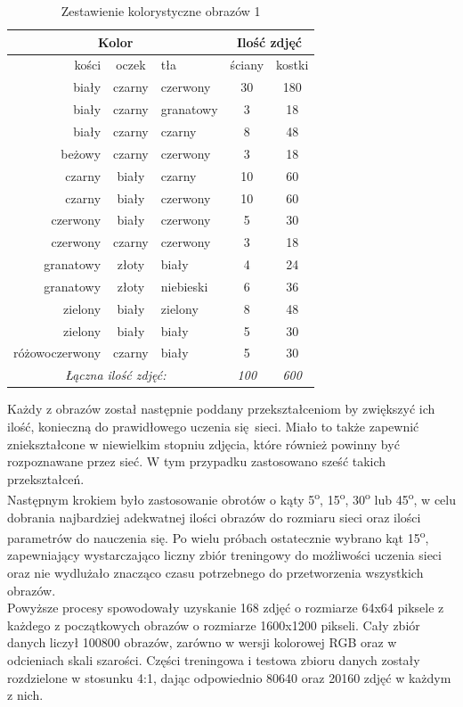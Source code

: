 \begin{table}[ht]
\centering
\begin{tabular}{rcl|cc}
 \multicolumn{3}{c}{Kolor} & \multicolumn{2}{c}{Ilość zdjęć} \\ \hline
kości & oczek & tła & ściany & kostki \\ \hline
biały & czarny & czerwony & 30 & 180 \\
biały & czarny & granatowy & 3 & 18 \\
biały & czarny & czarny & 8 & 48 \\
beżowy & czarny & czerwony & 3 & 18 \\
czarny & biały & czarny & 10 & 60 \\
czarny & biały & czerwony & 10 & 60 \\
czerwony & biały & czerwony & 5 & 30 \\
czerwony & czarny & czerwony & 3 & 18 \\
granatowy & złoty & biały & 4 & 24 \\
granatowy & złoty & niebieski & 6 & 36 \\
zielony & biały & zielony & 8 & 48 \\
zielony & biały & biały & 5 & 30 \\
różowoczerwony & czarny & biały & 5 & 30 \\ \hline
\multicolumn{3}{c}{\textit{Łączna ilość zdjęć:}} & \textit{100} & \textit{600}
\end{tabular}
\vspace{0.2cm}
\caption{Zestawienie kolorystyczne obrazów 1}
\label{tab:zestawienie1}
\end{table}

Każdy z obrazów został następnie poddany przekształceniom by zwiększyć ich ilość, konieczną
do prawidłowego uczenia się sieci. Miało to także zapewnić zniekształcone w niewielkim stopniu
zdjęcia, które również powinny być rozpoznawane przez sieć. W tym przypadku zastosowano sześć
takich przekształceń. \\
Następnym krokiem było zastosowanie obrotów o kąty 5\textsuperscript{o},
15\textsuperscript{o}, 30\textsuperscript{o} lub 45\textsuperscript{o}, w celu dobrania
najbardziej adekwatnej ilości obrazów do rozmiaru sieci oraz ilości parametrów
do nauczenia się. Po wielu próbach ostatecznie wybrano kąt 15\textsuperscript{o}, zapewniający
wystarczająco liczny zbiór treningowy do możliwości uczenia sieci oraz nie
wydlużało znacząco czasu potrzebnego do przetworzenia wszystkich obrazów.\\
Powyższe procesy spowodowały uzyskanie 168 zdjęć o rozmiarze 64x64 piksele z każdego
z początkowych obrazów o rozmiarze 1600x1200 pikseli. Cały zbiór danych liczył 100800
obrazów, zarówno w wersji kolorowej RGB oraz w odcieniach skali szarości. Części
treningowa i testowa zbioru danych zostały rozdzielone w stosunku 4:1, dając odpowiednio
80640 oraz 20160 zdjęć w każdym z nich. \\\\

